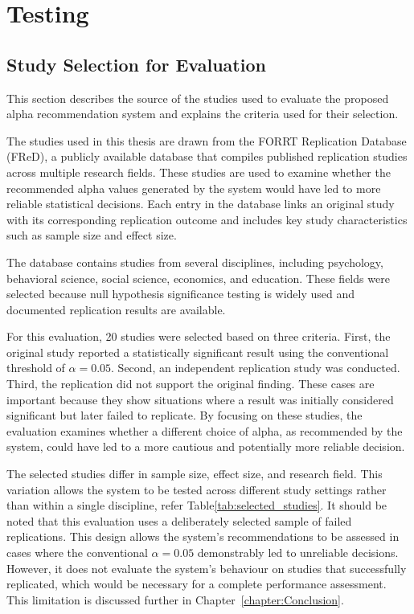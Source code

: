 \chapter{Testing}
\label{chapter:testing}
\section{Study Selection for Evaluation}


This section describes the source of the studies used to evaluate the proposed alpha recommendation system and explains the criteria used for their selection.

The studies used in this thesis are drawn from the FORRT Replication Database (FReD), a publicly available database that compiles published replication studies across multiple research fields\cite{FORRTFReDExplorer}. These studies are used to examine whether the recommended alpha values generated by the system would have led to more reliable statistical decisions. Each entry in the database links an original study with its corresponding replication outcome and includes key study characteristics such as sample size and effect size.

The database contains studies from several disciplines, including psychology, behavioral science, social science, economics, and education. These fields were selected because null hypothesis significance testing is widely used and documented replication results are available.

For this evaluation, 20 studies were selected based on three criteria. First, the original study reported a statistically significant result using the conventional threshold of $\alpha = 0.05$. Second, an independent replication study was conducted. Third, the replication did not support the original finding. These cases are important because they show situations where a result was initially considered significant but later failed to replicate. By focusing on these studies, the evaluation examines whether a different choice of alpha, as recommended by the system, could have led to a more cautious and potentially more reliable decision.

The selected studies differ in sample size, effect size, and research field. This variation allows the system to be tested across different study settings rather than within a single discipline, refer Table\ref{tab:selected_studies}. It should be noted that this evaluation uses a deliberately 
selected sample of failed replications. This design allows the 
system's recommendations to be assessed in cases where the 
conventional $\alpha = 0.05$ demonstrably led to unreliable 
decisions. However, it does not evaluate the system's behaviour 
on studies that successfully replicated, which would be necessary 
for a complete performance assessment. This limitation is 
discussed further in Chapter~\ref{chapter:Conclusion}.

